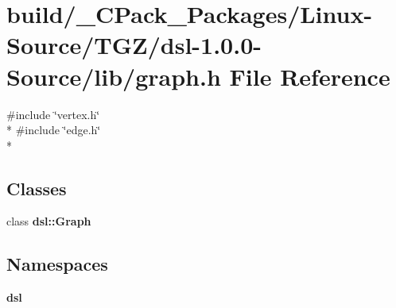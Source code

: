 \section{build/\-\_\-\-C\-Pack\-\_\-\-Packages/\-Linux-\/\-Source/\-T\-G\-Z/dsl-\/1.0.0-\/\-Source/lib/graph.h File Reference}
\label{build_2__CPack__Packages_2Linux-Source_2TGZ_2dsl-1_80_80-Source_2lib_2graph_8h}
{\ttfamily \#include \char`\"{}vertex.\-h\char`\"{}}\\*
{\ttfamily \#include \char`\"{}edge.\-h\char`\"{}}\\*
\subsection*{Classes}
\begin{DoxyCompactItemize}
\item 
class {\bf dsl\-::\-Graph}
\end{DoxyCompactItemize}
\subsection*{Namespaces}
\begin{DoxyCompactItemize}
\item 
{\bf dsl}
\end{DoxyCompactItemize}
